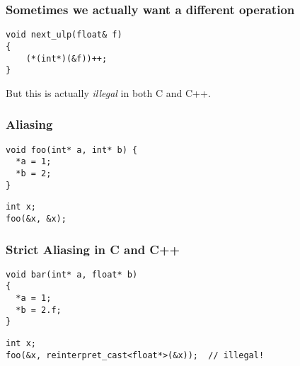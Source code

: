\documentclass[aspectratio=169]{beamer}
\newif\iftransitions
\begin{document}
\begin{frame}[fragile]

  \frametitle{Sometimes we actually want a different operation}
  
  \begin{lstlisting}
void next_ulp(float& f)
{
    (*(int*)(&f))++;
}
  \end{lstlisting}

  But this is actually \emph{illegal} in both C and C++.
\end{frame}


\begin{frame}[fragile]
  \frametitle{Aliasing}

  \iftransitions \pause \fi



  \begin{lstlisting}
void foo(int* a, int* b) {
  *a = 1;
  *b = 2;
}
  \end{lstlisting}
  \iftransitions \pause \fi
  \begin{lstlisting}
int x;
foo(&x, &x);
  \end{lstlisting}




\end{frame}


\begin{frame}[fragile]
  \frametitle{Strict Aliasing in C and C++}


  
  \begin{lstlisting}
void bar(int* a, float* b)
{
  *a = 1;
  *b = 2.f;
}
  \end{lstlisting}
  \begin{lstlisting}
int x;
foo(&x, reinterpret_cast<float*>(&x));  // illegal!
  \end{lstlisting}
  
\end{frame}
\end{document}
